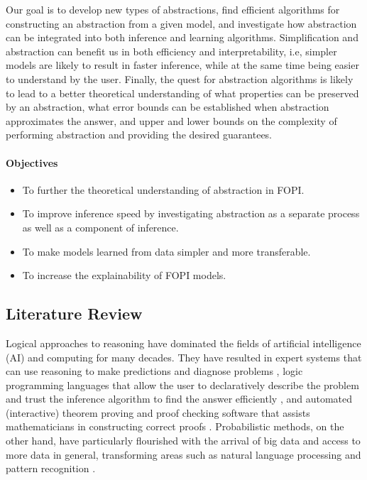 \documentclass{article}
\begin{document}
Our goal is to develop new types of abstractions, find efficient
algorithms for constructing an abstraction from a given model, and investigate
how abstraction can be integrated into both inference and learning algorithms.
Simplification and abstraction can benefit us in both efficiency and
interpretability, i.e, simpler models are likely to result in faster inference,
while at the same time being easier to understand by the user. Finally, the
quest for abstraction algorithms is likely to lead to a better theoretical
understanding of what properties can be preserved by an abstraction, what error
bounds can be established when abstraction approximates the answer, and upper
and lower bounds on the complexity of performing abstraction and providing the
desired guarantees.

\paragraph{Objectives}
\begin{itemize}
\item To further the theoretical understanding of abstraction in FOPI.
\item To improve inference speed by investigating abstraction as a separate
  process as well as a component of inference.
\item To make models learned from data simpler and more transferable.
\item To increase the explainability of FOPI models.
\end{itemize}

\subsection{Literature Review}

Logical approaches to reasoning have dominated the fields of artificial
intelligence (AI) and computing for many decades. They have resulted in expert
systems that can use reasoning to make predictions and diagnose problems
\cite{hayes1983building}, logic programming languages that allow the user to
declaratively describe the problem and trust the inference algorithm to find the
answer efficiently \cite{DBLP:books/sp/Lloyd87}, and automated (interactive)
theorem proving and proof checking software that assists mathematicians in
constructing correct proofs \cite{DBLP:books/el/RobinsonV01}. Probabilistic
methods, on the other hand, have particularly flourished with the arrival of big
data and access to more data in general, transforming areas such as natural
language processing and pattern recognition \cite{DBLP:series/sci/BrazAR08}.
\end{document}
